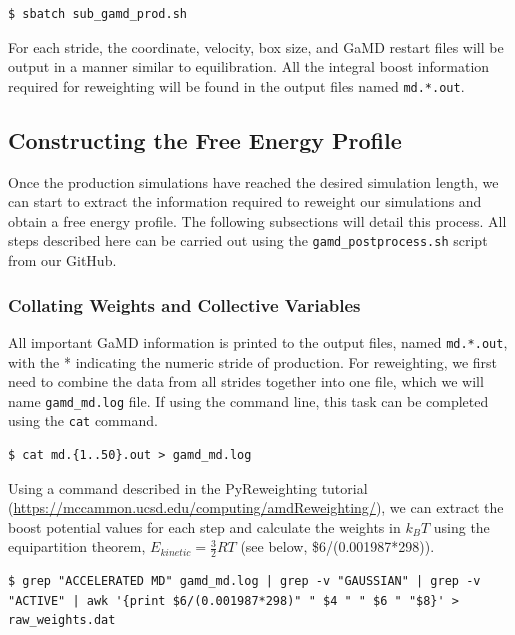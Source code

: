 \documentclass[9pt,tutorial]{livecoms}
\begin{document}
\begin{lstlisting}[style=MyBash]
$ sbatch sub_gamd_prod.sh
\end{lstlisting}

For each stride, the coordinate, velocity, box size, and GaMD restart files will be output in a manner similar to equilibration. All the integral boost information required for reweighting will be found in the output files named \texttt{md.*.out}.

\subsection{Constructing the Free Energy Profile}
Once the production simulations have reached the desired simulation length, we can start to extract the information required to reweight our simulations and obtain a free energy profile. The following subsections will detail this process. All steps described here can be carried out using the \texttt{gamd\_postprocess.sh} script from our GitHub. 

\subsubsection{Collating Weights and Collective Variables}
All important GaMD information is printed to the output files, named \texttt{md.*.out}, with the * indicating the numeric stride of production. For reweighting, we first need to combine the data from all strides together into one file, which we will name \texttt{gamd\_md.log} file. If using the command line, this task can be completed using the \texttt{cat} command.

\begin{lstlisting}[style=MyBash]
$ cat md.{1..50}.out > gamd_md.log
\end{lstlisting}

Using a command described in the PyReweighting tutorial (\url{https://mccammon.ucsd.edu/computing/amdReweighting/}), we can extract the boost potential values for each step and calculate the weights in $k_{B}T$ using the equipartition theorem, $E_{kinetic} = \frac{3}{2}RT$ (see below, \$6/(0.001987*298)).

\begin{lstlisting}[style=MyBash]
$ grep "ACCELERATED MD" gamd_md.log | grep -v "GAUSSIAN" | grep -v "ACTIVE" | awk '{print $6/(0.001987*298)" " $4 " " $6 " "$8}' > raw_weights.dat
\end{lstlisting}
\end{document}
